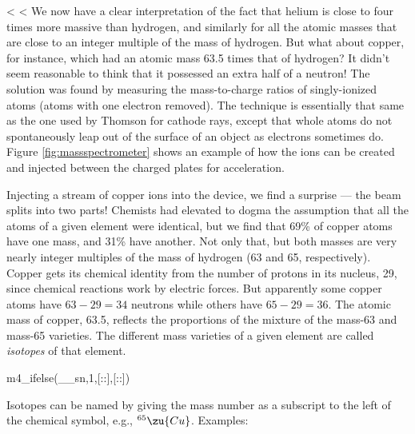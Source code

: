     <%
    <%
        We now have a clear interpretation of the fact that helium
        is close to four times more massive than hydrogen, and
        similarly for all the atomic masses that are close to an
        integer multiple of the mass of hydrogen. But what about
        copper, for instance, which had an atomic mass 63.5 times
        that of hydrogen? It didn't seem reasonable to think that it
        possessed an extra half of a neutron! The solution was found
        by measuring the mass-to-charge ratios of singly-ionized
        atoms (atoms with one electron removed). The technique is
        essentially that same as the one used by Thomson for cathode
        rays, except that whole atoms do not spontaneously leap out
        of the surface of an object as electrons sometimes do. 
        Figure \ref{fig:massspectrometer} shows an example of how the ions can be created and
        injected between the charged plates for acceleration.

        Injecting a stream of copper ions into the device, we find a
        surprise --- the beam splits into two parts! Chemists had
        elevated to dogma the assumption that all the atoms of a
        given element were identical, but we find that 69\% of
        copper atoms have one mass, and 31\% have another.  Not only
        that, but both masses are very nearly integer multiples of
        the mass of hydrogen (63 and 65, respectively).  Copper gets
        its chemical identity from the number of protons in its
        nucleus, 29, since chemical reactions work by electric
        forces. But apparently some copper atoms have $63-29=34$
        neutrons while others have $65-29=36$. The atomic mass of
        copper, 63.5, reflects the proportions of the mixture of the
        mass-63 and mass-65 varieties.  The different mass varieties
        of a given element are called \emph{isotopes} of that element.

m4_ifelse(__sn,1,[::],[:\pagebreak:])

        Isotopes can be named by giving the mass number as a
        subscript to the left of the chemical symbol, e.g.,
        $^{65}\zu{Cu}$. Examples:

